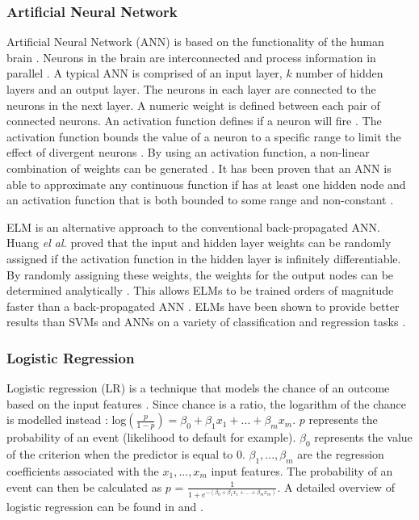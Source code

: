 \documentclass{sig-alternate-05-2015}
\begin{document}
	\subsubsection{Artificial Neural Network}
	Artificial Neural Network (ANN) is based on the functionality of the human brain \cite{Wang2003}. Neurons in the brain are interconnected and process information in parallel \cite{Wang2003}. A typical ANN is comprised of an input layer, $k$ number of hidden layers and an output layer. The neurons in each layer are connected to the neurons in the next layer. A numeric weight is defined between each pair of connected neurons. An activation function defines if a neuron will fire \cite{Wang2003}. The activation function bounds the value of a neuron to a specific range to limit the effect of divergent neurons \cite{Wang2003}. By using an activation function, a non-linear combination of weights can be generated \cite{Wang2003}. It has been proven that an ANN is able to approximate any continuous function if has at least one hidden node and an activation function that is both bounded to some range and non-constant \cite{Hornik1991251}.
	
	ELM is an alternative approach to the conventional back-propagated ANN. Huang \textit{el al.} \cite{Huang2006489} proved that the input and hidden layer weights can be randomly assigned if the activation function in the hidden layer is infinitely differentiable. By randomly assigning these weights, the weights for the output nodes can be determined analytically \cite{Huang2006489}. This allows ELMs to be trained orders of magnitude faster than a back-propagated ANN \cite{6035797, Huang2006489}. ELMs have been shown to provide better results than SVMs and ANNs on a variety of classification and regression tasks \cite{6035797, Huang2006489}.
	
	\subsubsection{Logistic Regression}
	Logistic regression (LR) is a technique that models the chance of an outcome based on the input features \cite{doi:10.11613/BM.2014.003}. Since chance is a ratio, the logarithm of the chance is modelled instead \cite{doi:10.11613/BM.2014.003}:
	log$(\frac{p}{1 - p}) = \beta_0 + \beta_1 x_1 + ... + \beta_m x_m$. $p$ represents the probability of an event (likelihood to default for example). $\beta_0$ represents the value of the criterion when the predictor is equal to 0. $\beta_1, ..., \beta_m$ are the regression coefficients associated with the $x_1, ..., x_m$ input features. The probability of an event can then be calculated as $p$ = $\frac{1}{1 + e^{-(\beta_0 + \beta_1 x_1 + ... + \beta_m x_m)}}$. A detailed overview of logistic regression can be found in \cite{Mood01022010} and \cite{doi:10.11613/BM.2014.003}.
	
\end{document}
